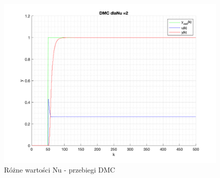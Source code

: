 \documentclass[a4paper, 11pt]{article}
\begin{document}
\begin{enumerate}
 \begin{figure} [h]
\centering
 \includegraphics[width=\linewidth]{./ModelsP4_Nu/P4_DMC_Nu_2_png.png} 
 \caption[Różne wartości Nu - przebiegi DMC]
{Różne wartości Nu - przebiegi DMC}
 \end{figure}
 

\end{enumerate}
\end{document}
